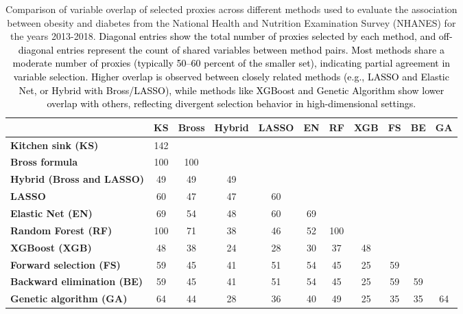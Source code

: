 \documentclass[10pt,letterpaper]{article}
\begin{document}
\begin{landscape} 

\begin{table}[htbp]
\centering
\caption{Comparison of variable overlap of selected proxies across different methods used to evaluate the association between obesity and diabetes from the National Health and Nutrition Examination Survey (NHANES) for the years 2013-2018. \textcolor{black}{Diagonal entries show the total number of proxies selected by each method, and off-diagonal entries represent the count of shared variables between method pairs. Most methods share a moderate number of proxies (typically 50–60 percent of the smaller set), indicating partial agreement in variable selection. Higher overlap is observed between closely related methods (e.g., LASSO and Elastic Net, or Hybrid with Bross/LASSO), while methods like XGBoost and Genetic Algorithm show lower overlap with others, reflecting divergent selection behavior in high-dimensional settings.}}
\label{tab:method-comparison-updated}
\begin{tabular}{lcccccccccc}
\toprule
 & \textbf{KS} & \textbf{Bross} & \textbf{Hybrid} & \textbf{LASSO} & \textbf{EN} & \textbf{RF} & \textbf{XGB} & \textbf{FS} & \textbf{BE} & \textbf{GA} \\
\midrule
\textbf{Kitchen sink (KS)} & 142 & & & & & & & & & \\
\textbf{Bross formula} & 100 & 100 & & & & & & & & \\
\textbf{Hybrid (Bross and LASSO)} & 49 & 49 & 49 & & & & & & & \\
\textbf{LASSO} & 60 & 47 & 47 & 60 & & & & & & \\
\textbf{Elastic Net (EN)} & 69 & 54 & 48 & 60 & 69 & & & & & \\
\textbf{Random Forest (RF)} & 100 & 71 & 38 & 46 & 52 & 100 & & & & \\  
\textbf{XGBoost (XGB)} & 48 & 38 & 24 & 28 & 30 & 37 & 48 & & & \\
\textbf{Forward selection (FS)} & 59 & 45 & 41 & 51 & 54 & 45 & 25 & 59 & & \\
\textbf{Backward elimination (BE)} & 59 & 45 & 41 & 51 & 54 & 45 & 25 & 59 & 59 & \\
\textbf{Genetic algorithm (GA)} & 64 & 44 & 28 & 36 & 40 & 49 & 25 & 35 & 35 & 64 \\
\bottomrule
\end{tabular}
\end{table}

\end{landscape}
\end{document}
